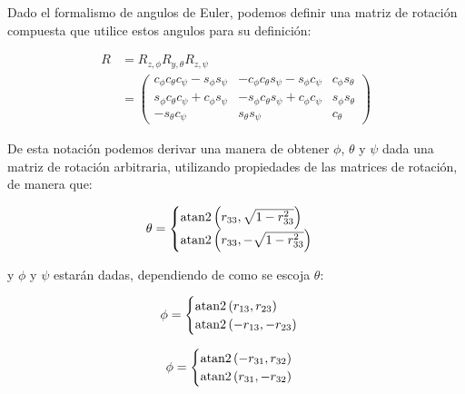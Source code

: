 \begin{multicols*}{2}
            Dado el formalismo de angulos de Euler, podemos definir una matriz de rotación compuesta que utilice estos angulos para su definición:

            \begin{align}
                R &= R_{z, \phi} R_{y, \theta} R_{z, \psi} \nonumber \\
                &=
                \begin{pmatrix}
                    c_{\phi} c_{\theta} c_{\psi} - s_{\phi} s_{\psi} & - c_{\phi} c_{\theta} s_{\psi} - s_{\phi} c_{\psi} & c_{\phi} s_{\theta} \\
                    s_{\phi} c_{\theta} c_{\psi} + c_{\phi} s_{\psi} & - s_{\phi} c_{\theta} s_{\psi} + c_{\phi} c_{\psi} & s_{\phi} s_{\theta} \\
                    - s_{\theta} c_{\psi} & s_{\theta} s_{\psi} & c_{\theta}
                \end{pmatrix}
            \end{align}

            De esta notación podemos derivar una manera de obtener $\phi$, $\theta$ y $\psi$ dada una matriz de rotación arbitraria, utilizando propiedades de las matrices de rotación, de manera que:

            \begin{equation}
                \theta =
                \begin{cases}
                    \operatorname{atan2}{\left( r_{33}, \sqrt{1 - r_{33}^2} \right)} \\
                    \operatorname{atan2}{\left( r_{33}, -\sqrt{1 - r_{33}^2} \right)}
                \end{cases}
            \end{equation}

            y $\phi$ y $\psi$ estarán dadas, dependiendo de como se escoja $\theta$:

            \begin{equation}
                \phi =
                \begin{cases}
                    \operatorname{atan2}{(r_{13}, r_{23})} \\
                    \operatorname{atan2}{(-r_{13}, -r_{23})}
                \end{cases}
            \end{equation}

            \begin{equation}
                \phi =
                \begin{cases}
                    \operatorname{atan2}{(-r_{31}, r_{32})} \\
                    \operatorname{atan2}{(r_{31}, -r_{32})}
                \end{cases}
            \end{equation}


\end{multicols*}
